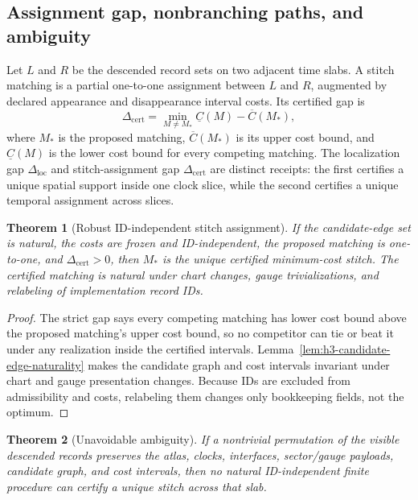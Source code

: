 \documentclass[11pt]{article}
\newtheorem{theorem}{Theorem}[section]
\begin{document}
\subsection{Assignment gap, nonbranching paths, and ambiguity}

Let \(L\) and \(R\) be the descended record sets on two adjacent time slabs. A stitch matching is a
partial one-to-one assignment between \(L\) and \(R\), augmented by declared appearance and
disappearance interval costs. Its certified gap is
\[
\Delta_{\mathrm{cert}}
=\min_{M\ne M_*}\underline C(M)-\overline C(M_*),
\]
where \(M_*\) is the proposed matching, \(\overline C(M_*)\) is its upper cost bound, and
\(\underline C(M)\) is the lower cost bound for every competing matching.
The localization gap \(\Delta_{\mathrm{loc}}\) and stitch-assignment gap
\(\Delta_{\mathrm{cert}}\) are distinct receipts: the first certifies a unique spatial support
inside one clock slice, while the second certifies a unique temporal assignment across slices.

\begin{theorem}[Robust ID-independent stitch assignment]\label{thm:h3-robust-stitch-assignment}
If the candidate-edge set is natural, the costs are frozen and ID-independent, the proposed
matching is one-to-one, and \(\Delta_{\mathrm{cert}}>0\), then \(M_*\) is the unique certified
minimum-cost stitch. The certified matching is natural under chart changes, gauge
trivializations, and relabeling of implementation record IDs.
\end{theorem}

\begin{proof}
The strict gap says every competing matching has lower cost bound above the proposed matching's
upper cost bound, so no competitor can tie or beat it under any realization inside the certified
intervals. Lemma~\ref{lem:h3-candidate-edge-naturality} makes the candidate graph and cost
intervals invariant under chart and gauge presentation changes. Because IDs are excluded from
admissibility and costs, relabeling them changes only bookkeeping fields, not the optimum.
\end{proof}

\begin{theorem}[Unavoidable ambiguity]\label{thm:h3-unavoidable-ambiguity}
If a nontrivial permutation of the visible descended records preserves the atlas, clocks,
interfaces, sector/gauge payloads, candidate graph, and cost intervals, then no natural
ID-independent finite procedure can certify a unique stitch across that slab.
\end{theorem}
\end{document}

